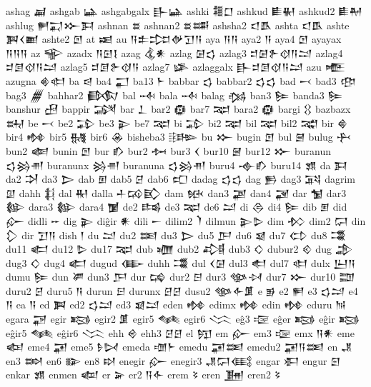  ashag  𒃷   
 ashgab  𒀿   
 ashgabgalx  𒃲𒀿    
 ashki  𒍤𒆸    
 ashkud  𒀾𒈽    
 ashkud2  𒀾𒈹    
 ashlug  𒂍𒍑𒁍𒁕    
 ashnan  𒊺   
 ashnan2  𒊺𒌁    
 ashsha2  𒃰𒋺    
 ashta  𒃰𒋺    
 ashte  𒀉𒌋𒆤    
 ashte2  𒆹   
 at  𒀜   
 au  𒀀𒉺𒄐𒉻𒋛𒀀    
 aya  𒀀𒀀    
 aya2  𒀀   
 aya4  𒆹   
 ayayax  𒀀𒀀𒀀    
 az  𒊍   
 azadx  𒀀𒇉𒋙    
 azag  𒆬𒀭    
 azlag  𒌆𒌓    
 azlag3  𒄑𒌆𒉿𒋼𒀀𒁺    
 azlag4  𒄑𒌆𒋼𒀀𒁺    
 azlag5  𒄑𒌆𒉿𒋼𒀀    
 azlag7  𒈐   
 azlaggalx  𒃲𒄑𒌆𒋼𒀀𒁺    
 azu  𒍬   
 azugna  𒄯𒊕    
 ba  𒁀   
 ba4  𒂷   
 ba13  𒈨   
 babbar  𒌓   
 babbar2  𒌓𒌓    
 bad  𒁁   
 bad3  𒂦   
 bag3  𒁂   
 bahhar2  𒁃   
 bal  𒁄   
 bala  𒁄   
 balag  𒁆   
 ban3  𒌉   
 banda3  𒌉   
 banshur  𒍎   
 bappir  𒋋   
 bar  𒁇   
 bar2  𒁈   
 bar7  𒉈   
 bara2  𒁈   
 bargi  𒌐   
 bazbazx  𒊻   
 be  𒁁   
 be2  𒁉   
 be3  𒉌   
 be7  𒉈   
 bi  𒁉   
 bi2  𒉈   
 bil  𒉈   
 bil2  𒉋   
 bir  𒄵   
 bir4  𒂔   
 bir5  𒉆   
 bir6  𒊶   
 bisheba3  𒄡   
 bu  𒁍   
 bugin  𒆹   
 bul  𒇧   
 bulug  𒁑   
 bun2  𒅮   
 bunin  𒆹   
 bur  𒁓   
 bur2  𒁔   
 bur3  𒌋   
 bur10  𒇧   
 bur12  𒁍   
 buranun  𒌓𒄒𒉣    
 buranunx  𒄒𒉣    
 buranuna  𒌓𒄒𒉣    
 buru4  𒉢𒁓    
 buru14  𒂙   
 da  𒁕   
 da2  𒋫   
 da3  𒆕   
 dab  𒁳   
 dab5  𒆪   
 dab6  𒍏   
 dadag  𒌓𒌓    
 dag  𒁖   
 dag3  𒍴   
 dagrim  𒇑   
 dahh  𒈭   
 dal  𒊑   
 dalla  𒈦𒄘𒃼    
 dam  𒁮   
 dan3  𒃩   
 dan4  𒃋   
 dar  𒁯   
 dar3  𒁰   
 dara3  𒁰   
 dara4  𒁱   
 de2  𒌤   
 de3  𒉈   
 de6  𒁺   
 di  𒁲   
 di4  𒌉   
 dib  𒁳   
 did  𒅎   
 didli  𒐀   
 dig  𒉌   
 diĝir  𒀭   
 dili  𒀸   
 dilim2  𒇺   
 dilmun  𒉌𒌇    
 dim  𒁴   
 dim2  𒁶   
 din  𒁷   
 dir  𒋛𒀀    
 dish  𒁹   
 du  𒁺   
 du2  𒌅   
 du3  𒆕   
 du5  𒂅   
 du6  𒇯   
 du7  𒌌   
 du8  𒂃   
 du11  𒅗   
 du12  𒌇   
 du17  𒉈   
 dub  𒁾   
 dub2  𒂀   
 dub3  𒄭   
 dubur2  𒄶   
 dug  𒂁   
 dug3  𒄭   
 dug4  𒅗   
 dugud  𒂂   
 duhh  𒂃   
 dul  𒌋𒌆    
 dul3  𒊨   
 dul7  𒊕   
 dulx  𒌨𒀀       
 dumu  𒌉   
 dun  𒂄   
 dun3  𒂅   
 dur  𒄙   
 dur2  𒂉   
 dur3  𒀲𒀴    
 dur7  𒁍   
 dur10  𒊿   
 duru2  𒆪   
 duru5  𒀀   
 durun  𒂉   
 durunx  𒆪𒆪    
 dusu2  𒀲𒅆𒂠    
 e  𒂊   
 e2  𒂍   
 e3  𒌓𒁺    
 e4  𒀀   
 ea  𒀀   
 ed  𒀉   
 ed2  𒌓𒁺    
 ed3  𒇯𒁺    
 eden  𒂔   
 edimx  𒂔   
 edin  𒂔   
 eduru  𒀁   
 egara  𒃌   
 egir  𒂕   
 egir2  𒂠   
 egir5  𒈝   
 egir6  𒈱   
 eĝ3  𒉘   
 eĝer  𒂕   
 eĝir  𒂕   
 eĝir5  𒈝   
 eĝir6  𒈱   
 ehh  𒄴   
 ehh3  𒆪𒆪    
 el  𒂖   
 em  𒅎   
 em3  𒉘   
 emx  𒀀𒀭    
 eme  𒅴   
 eme4  𒂼   
 eme5  𒊩𒄸    
 emeda  𒌝𒈨    
 emedu  𒂼𒌅    
 emedu2  𒂼𒀀𒌅    
 en  𒂗   
 en3  𒇷   
 en6  𒅔   
 en8  𒊭   
 enegir  𒅎   
 enegir3  𒂗𒁶𒍼    
 engar  𒀳   
 engur  𒇉   
 enkar  𒂙   
 enmen  𒆉   
 er  𒅕   
 er2  𒀀𒅆    
 erem  𒂟   
 eren  𒂞   
 eren2  𒂟   
